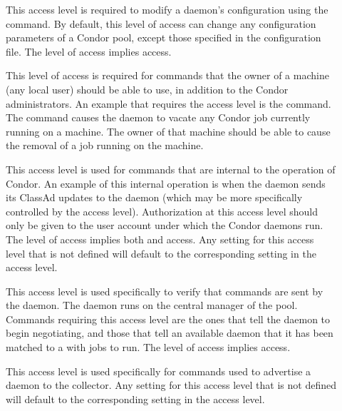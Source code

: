 \begin{description}
\item[] \label{sec-level-config} This access level is
   required to modify a daemon's configuration using
   the  command.
   By default, this level of access can
   change any configuration parameters of a Condor pool,
   except those specified in
   the  configuration file.
   The  level of access implies  access. 

\item[] \label{sec-level-owner} This level of access is
   required for commands that the owner of a machine (any local user)
   should be able to use, in addition to the Condor administrators.
   An example that requires the  access level is
   the  command.
   The command causes the  daemon to vacate any
   Condor job currently running on a machine.
   The owner of that machine should be able to cause the removal
   of a job running on the machine.

\item[] \label{sec-level-daemon} This access level
   is used for commands that are internal to the operation of
   Condor.  An example of this internal operation is when the
    daemon sends
   its ClassAd updates to the  daemon (which may be
   more specifically controlled by the 
   access level).
   Authorization at this access level should only be given to
   the user account under which the Condor daemons run.
   The  level of access implies both
    and  access.  Any setting for this access
   level that is not defined will default to the corresponding setting
   in the  access level.

\item[] \label{sec-level-negotiator} This 
   access level is used specifically to verify that commands are
   sent by the  daemon.
   The  daemon runs on the central manager of
   the pool.
   Commands requiring this access
   level are the ones that tell the  daemon to begin
   negotiating, and those that tell an available  daemon
   that it has been matched to a  with jobs to run.
   The  level of access implies  access. 

\item[] \label{sec-level-advertise-master} This
   access level is used specifically for commands used to advertise a
    daemon to the collector.  Any setting for this access
   level that is not defined will default to the corresponding setting
   in the  access level.


\end{description}
